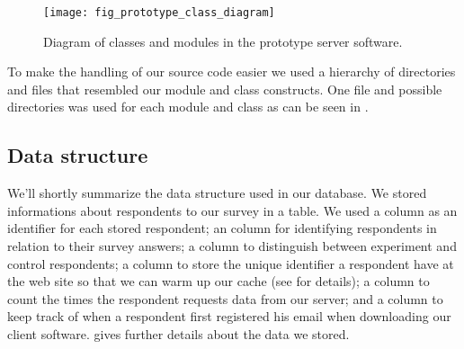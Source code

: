 \begin{figure}
  \begin{whole}
    \texttt{[image: fig\_prototype\_class\_diagram]}
    \caption[Prototype Class Diagram]{
      Diagram of classes and modules in the prototype server software.
    }
    \label{figure:fig.prototype.class.diagram}
  \end{whole}
\end{figure}

To make the handling of our source code easier we used a hierarchy of
directories and files that resembled our module and class constructs. One
file and possible directories was used for each module and class
as can be seen in .

\subsection{Data structure}

We'll shortly summarize the data structure used in our database. We
stored informations about respondents to our survey
in a  table. We used a  column as
an identifier for each stored respondent; an  column for
identifying respondents in relation to their survey answers; a 
column to distinguish between experiment and control respondents; a
 column to store the unique identifier a respondent have at
the \urort{} web site so that we can warm up our cache (see
 for details);
a  column to count the times the respondent requests data from
our server; and a  column to keep track of when a respondent
first registered his email when downloading our client software.
gives further details about the data we stored.

